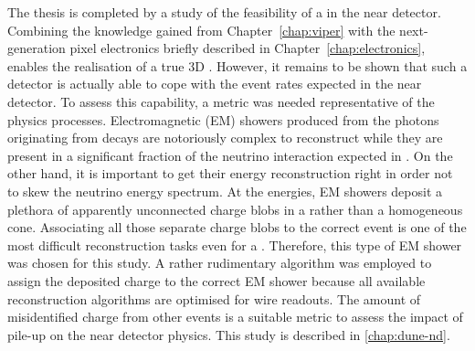 The thesis is completed by a study of the feasibility of a \lartpc{} in the \dune{} near detector.
Combining the knowledge gained from Chapter~\ref{chap:viper} with the next-generation pixel electronics briefly described in Chapter~\ref{chap:electronics}, enables the realisation of a true 3D \lartpc{}.
However, it remains to be shown that such a detector is actually able to cope with the event rates expected in the near detector.
To assess this capability, a metric was needed representative of the physics processes.
Electromagnetic (EM) showers produced from the photons originating from \Pgpz decays are notoriously complex to reconstruct while they are present in a significant fraction of the neutrino interaction expected in \dune{}.
On the other hand, it is important to get their energy reconstruction right in order not to skew the neutrino energy spectrum.
At the \dune{} energies, EM showers deposit a plethora of apparently unconnected charge blobs in a \lartpc{} rather than a homogeneous cone.
Associating all those separate charge blobs to the correct event is one of the most difficult reconstruction tasks even for a \lartpc{}.
Therefore, this type of EM shower was chosen for this study.
A rather rudimentary algorithm was employed to assign the deposited charge to the correct EM shower because all available \lartpc{} reconstruction algorithms are optimised for wire readouts.
The amount of misidentified charge from other events is a suitable metric to assess the impact of pile-up on the near detector physics.
This study is described in \ref{chap:dune-nd}.
